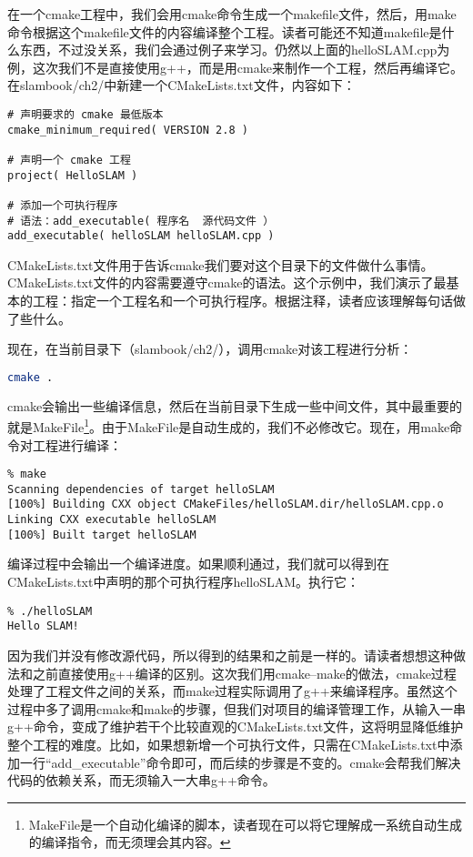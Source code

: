 在一个cmake工程中，我们会用cmake命令生成一个makefile文件，然后，用make命令根据这个makefile文件的内容编译整个工程。读者可能还不知道makefile是什么东西，不过没关系，我们会通过例子来学习。仍然以上面的helloSLAM.cpp为例，这次我们不是直接使用g++，而是用cmake来制作一个工程，然后再编译它。在slambook/ch2/中新建一个CMakeLists.txt文件，内容如下：

\clearpage
\begin{lstlisting}[caption=slambook/ch2/CMakeLists.txt]
# 声明要求的 cmake 最低版本
cmake_minimum_required( VERSION 2.8 )

# 声明一个 cmake 工程
project( HelloSLAM )

# 添加一个可执行程序
# 语法：add_executable( 程序名  源代码文件 ）
add_executable( helloSLAM helloSLAM.cpp )
\end{lstlisting}

CMakeLists.txt文件用于告诉cmake我们要对这个目录下的文件做什么事情。CMakeLists.txt文件的内容需要遵守cmake的语法。这个示例中，我们演示了最基本的工程：指定一个工程名和一个可执行程序。根据注释，读者应该理解每句话做了些什么。

现在，在当前目录下（slambook/ch2/），调用cmake对该工程进行分析：

\begin{lstlisting}[language=sh]
cmake .
\end{lstlisting}

cmake会输出一些编译信息，然后在当前目录下生成一些中间文件，其中最重要的就是MakeFile\footnote{MakeFile是一个自动化编译的脚本，读者现在可以将它理解成一系统自动生成的编译指令，而无须理会其内容。}。由于MakeFile是自动生成的，我们不必修改它。现在，用make命令对工程进行编译：
\begin{lstlisting}
% make
Scanning dependencies of target helloSLAM
[100%] Building CXX object CMakeFiles/helloSLAM.dir/helloSLAM.cpp.o
Linking CXX executable helloSLAM
[100%] Built target helloSLAM
\end{lstlisting}

编译过程中会输出一个编译进度。如果顺利通过，我们就可以得到在CMakeLists.txt中声明的那个可执行程序helloSLAM。执行它：
\begin{lstlisting}
% ./helloSLAM
Hello SLAM!
\end{lstlisting}

因为我们并没有修改源代码，所以得到的结果和之前是一样的。请读者想想这种做法和之前直接使用g++编译的区别。这次我们用cmake--make的做法，cmake过程处理了工程文件之间的关系，而make过程实际调用了g++来编译程序。虽然这个过程中多了调用cmake和make的步骤，但我们对项目的编译管理工作，从输入一串g++命令，变成了维护若干个比较直观的CMakeLists.txt文件，这将明显降低维护整个工程的难度。比如，如果想新增一个可执行文件，只需在CMakeLists.txt中添加一行“add\_executable”命令即可，而后续的步骤是不变的。cmake会帮我们解决代码的依赖关系，而无须输入一大串g++命令。

